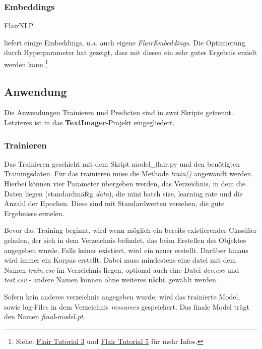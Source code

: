 \documentclass[10pt,a4paper]{article}
\begin{document}
\subsubsection{Embeddings}
\begin{flushleft}
\hypertarget{Embed}{FlairNLP} liefert einige Embeddings, u.a. auch eigene \textit{FlairEmbeddings}. Die Optimierung durch Hyperparameter hat gezeigt, dass mit diesen ein sehr gutes Ergebnis erzielt werden kann.\footnote{Siehe: \href{https://github.com/flairNLP/flair/blob/master/resources/docs/TUTORIAL_3_WORD_EMBEDDING.md}{Flair Tutorial 3} und \href{https://github.com/flairNLP/flair/blob/master/resources/docs/TUTORIAL_5_WORD_EMBEDDING.md}{Flair Tutorial 5} für mehr Infos.}
\end{flushleft}

\subsection{Anwendung}
\begin{flushleft}
Die Anwendungen Trainieren und Predicten sind in zwei Skripte getrennt. Letzteres ist in das \textbf{TextImager}-Projekt eingegliedert.
\end{flushleft}

\subsubsection{Trainieren}
\begin{flushleft}
Das Trainieren geschieht mit dem Skript model\_flair.py und den benötigten Trainingsdaten. Für das trainieren muss die Methode \textit{train()} angewandt werden. Hierbei können vier Parameter übergeben werden, das Verzeichnis, in dem die Daten liegen (standardmäßig \textit{data}), die mini batch size, learning rate und die Anzahl der Epochen. Diese sind mit Standardwerten versehen, die gute Ergebnisse erzielen.

Bevor das Training beginnt, wird wenn möglich ein bereits existierender Classifier geladen, der sich in dem Verzeichnis befindet, das beim Erstellen des Objektes angegeben wurde. Falls keiner existiert, wird ein neuer erstellt. Darüber hinaus wird immer ein Korpus erstellt. Dabei muss mindestens eine datei mit dem Namen \textit{train.csv} im Verzeichnis liegen, optional auch eine Datei \textit{dev.csv} und \textit{test.csv} - andere Namen können ohne weiteres \textbf{nicht} gewählt werden.

Sofern kein anderes verzeichnis angegeben wurde, wird das trainierte Model, sowie log-Files in dem Verzeichnis \textit{resources} gespeichert. Das finale Model trägt den Namen \glqq\textit{final-model.pt}\grqq{}.
\end{flushleft}
\end{document}
